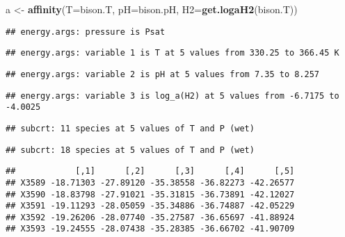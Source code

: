 \documentclass[]{article}
\newenvironment{Shaded}{\begin{snugshade}}{\end{snugshade}}
\newcommand{\KeywordTok}[1]{\textcolor[rgb]{0.13,0.29,0.53}{\textbf{#1}}}
\newcommand{\DataTypeTok}[1]{\textcolor[rgb]{0.13,0.29,0.53}{#1}}
\newcommand{\StringTok}[1]{\textcolor[rgb]{0.31,0.60,0.02}{#1}}
\newcommand{\OperatorTok}[1]{\textcolor[rgb]{0.81,0.36,0.00}{\textbf{#1}}}
\newcommand{\NormalTok}[1]{#1}
\begin{document}
\begin{Shaded}
\begin{Highlighting}[]
\NormalTok{a <-}\StringTok{ }\KeywordTok{affinity}\NormalTok{(}\DataTypeTok{T=}\NormalTok{bison.T, }\DataTypeTok{pH=}\NormalTok{bison.pH, }\DataTypeTok{H2=}\KeywordTok{get.logaH2}\NormalTok{(bison.T))}
\end{Highlighting}
\end{Shaded}

\begin{verbatim}
## energy.args: pressure is Psat
\end{verbatim}

\begin{verbatim}
## energy.args: variable 1 is T at 5 values from 330.25 to 366.45 K
\end{verbatim}

\begin{verbatim}
## energy.args: variable 2 is pH at 5 values from 7.35 to 8.257
\end{verbatim}

\begin{verbatim}
## energy.args: variable 3 is log_a(H2) at 5 values from -6.7175 to -4.0025
\end{verbatim}

\begin{verbatim}
## subcrt: 11 species at 5 values of T and P (wet)
\end{verbatim}

\begin{verbatim}
## subcrt: 18 species at 5 values of T and P (wet)
\end{verbatim}

\begin{Shaded}
\end{Shaded}

\begin{verbatim}
##            [,1]      [,2]      [,3]      [,4]      [,5]
## X3589 -18.71303 -27.89120 -35.38558 -36.82273 -42.26577
## X3590 -18.83798 -27.91021 -35.31815 -36.73891 -42.12027
## X3591 -19.11293 -28.05059 -35.34886 -36.74887 -42.05229
## X3592 -19.26206 -28.07740 -35.27587 -36.65697 -41.88924
## X3593 -19.24555 -28.07438 -35.28385 -36.66702 -41.90709
\end{verbatim}
\end{document}
